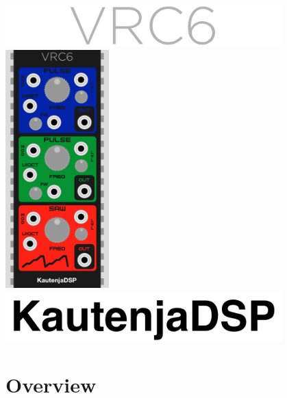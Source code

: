 \documentclass[12pt,a4paper]{article}
\begin{document}

\thispagestyle{empty}
\vspace*{\fill}
\begin{center}
\includegraphics[width=0.8\textwidth]{VRC6-Logo}
\linebreak\linebreak\linebreak\linebreak
\includegraphics[width=0.3\textwidth]{VRC6-Module}
\linebreak\linebreak\linebreak\linebreak
\includegraphics[width=0.8\textwidth]{KautenjaDSP}
\end{center}
\vspace*{\fill}
\clearpage


\section{Overview}
\end{document}
